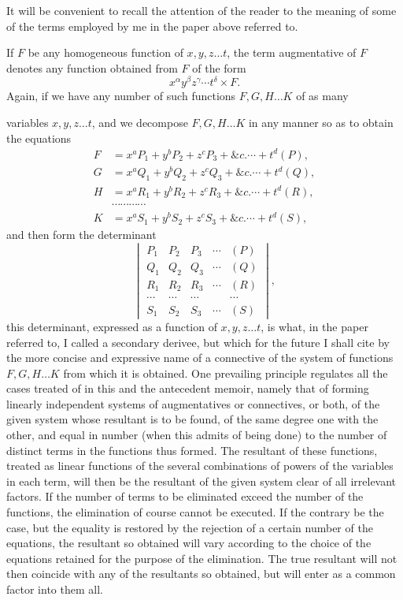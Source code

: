 \documentclass[11pt]{article}
\newcommand{\sourcepage}[1]{\marginpar{\scriptsize p.~#1}}
\begin{document}
{{It will be convenient to recall the attention of the reader to the meaning of some of the terms employed by me in the paper above referred to.

If $F$ be any homogeneous function of $x,y,z\ldots t$, the term augmentative of $F$ denotes any function obtained from $F$ of the form
\[
 x^\alpha y^\beta z^\gamma\cdots t^\delta\times F.
\]
Again, if we have any number of such functions $F,G,H\ldots K$ of as many

\sourcepage{257}
variables $x,y,z\ldots t$, and we decompose $F,G,H\ldots K$ in any manner so as to obtain the equations
\[
\begin{aligned}
F&=x^aP_1+y^bP_2+z^cP_3+\&c.\cdots+t^d(P),\\
G&=x^aQ_1+y^bQ_2+z^cQ_3+\&c.\cdots+t^d(Q),\\
H&=x^aR_1+y^bR_2+z^cR_3+\&c.\cdots+t^d(R),\\
&\cdots\cdots\cdots\cdots\\
K&=x^aS_1+y^bS_2+z^cS_3+\&c.\cdots+t^d(S),
\end{aligned}
\]
and then form the determinant
\[
\begin{vmatrix}
P_1&P_2&P_3&\cdots&(P)\\
Q_1&Q_2&Q_3&\cdots&(Q)\\
R_1&R_2&R_3&\cdots&(R)\\
\cdots&\cdots&\cdots&&\cdots\\
S_1&S_2&S_3&\cdots&(S)
\end{vmatrix},
\]
this determinant, expressed as a function of $x,y,z\ldots t$, is what, in the paper referred to, I called a secondary derivee, but which for the future I shall cite by the more concise and expressive name of a connective of the system of functions $F,G,H\ldots K$ from which it is obtained. One prevailing principle regulates all the cases treated of in this and the antecedent memoir, namely that of forming linearly independent systems of augmentatives or connectives, or both, of the given system whose resultant is to be found, of the same degree one with the other, and equal in number (when this admits of being done) to the number of distinct terms in the functions thus formed. The resultant of these functions, treated as linear functions of the several combinations of powers of the variables in each term, will then be the resultant of the given system clear of all irrelevant factors. If the number of terms to be eliminated exceed the number of the functions, the elimination of course cannot be executed. If the contrary be the case, but the equality is restored by the rejection of a certain number of the equations, the resultant so obtained will vary according to the choice of the equations retained for the purpose of the elimination. The true resultant will not then coincide with any of the resultants so obtained, but will enter as a common factor into them all.

}}
\end{document}
